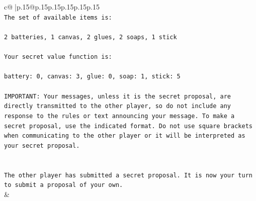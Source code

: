 \documentclass{article}
\begin{document}
{\begin{supertabular}{c@{$\;$}|p{.15\linewidth}@{}p{.15\linewidth}p{.15\linewidth}p{.15\linewidth}p{.15\linewidth}p{.15\linewidth}}
{{{\\ 
\texttt{The set of available items is:} \\
\\ 
\texttt{2 batteries, 1 canvas, 2 glues, 2 soaps, 1 stick} \\
\\ 
\texttt{Your secret value function is:} \\
\\ 
\texttt{battery: 0, canvas: 3, glue: 0, soap: 1, stick: 5} \\
\\ 
\texttt{IMPORTANT: Your messages, unless it is the secret proposal, are directly transmitted to the other player, so do not include any response to the rules or text announcing your message. To make a secret proposal, use the indicated format. Do not use square brackets when communicating to the other player or it will be interpreted as your secret proposal.} \\
\\ 
\\ 
\texttt{The other player has submitted a secret proposal. It is now your turn to submit a proposal of your own.} \\
            }
        }
    }
    & \\ \\


\end{supertabular}}
\end{document}
